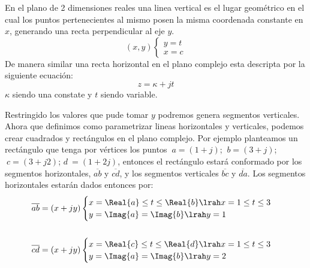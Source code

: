En el plano de 2 dimensiones reales una linea vertical es el lugar geométrico en el cual los puntos pertenecientes al mismo posen la misma coordenada constante en $x$, generando una recta perpendicular al eje $y$.
\begin{equation}
    (x,y)\begin{cases}
        y=t\\
        x=c
    \end{cases}
\end{equation}
De manera similar una recta horizontal en el plano complejo esta descripta por la siguiente ecuación:
\begin{equation}\label{eq:DeflvF}
    z=\kappa+jt
\end{equation}
$\kappa$ siendo una constate y $t$ siendo variable.
\begin{figure}[H]
    \centering
    \begin{minipage}{0.45\textwidth}
        \centering
        
    \end{minipage}
    \begin{minipage}{0.45\textwidth}
        \centering
        
    \end{minipage}
    \caption{}
    \label{fig:ComVHF}
\end{figure}
Restringido los valores que pude tomar $y$ podremos genera segmentos verticales.
Ahora que definimos como parametrizar lineas horizontales y verticales, podemos crear cuadrados y rectángulos en el plano complejo. Por ejemplo planteamos un rectángulo que tenga por vértices los puntos $\ a=(1+j)$; $\ b=(3+j)$; $\ c=(3+j2)$; $d\ =(1+2j)$, entonces el rectángulo estará conformado por los segmentos horizontales, $\overline{ab}$ y $\overline{cd}$, y los segmentos verticales $\overline{bc}$ y $\overline{da}$. Los segmentos horizontales estarán dados entonces por:
\begin{equation}
\begin{aligned}
    \overline{ab}=(x+jy)&
    \begin{cases}
        x=\Real{a}\leq t\leq\Real{b}\lrah x=1\leq t\leq 3\\
        y=\Imag{a}=\Imag{b}\lrah y=1
    \end{cases}\\
    \\
    \overline{cd}=(x+jy)&
    \begin{cases}
        x= \Real{c}\leq t\leq\Real{d}\lrah x=1\leq t\leq 3\\
        y=\Imag{a}=\Imag{b} \lrah y=2
    \end{cases}
\end{aligned}
\end{equation}
